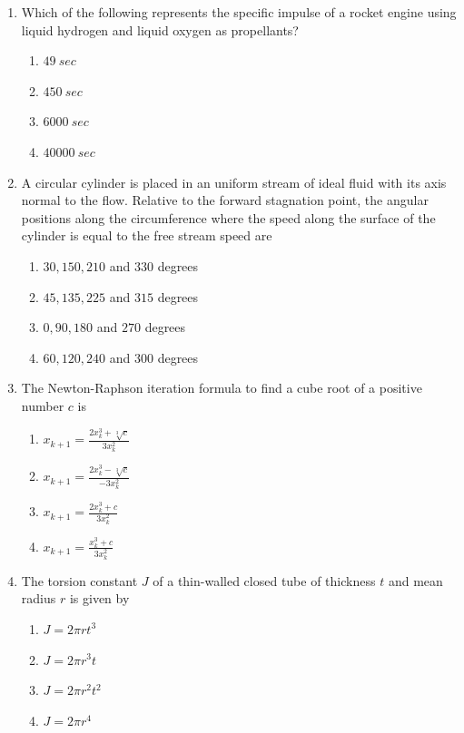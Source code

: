 \documentclass{article}
\begin{document}
\begin{enumerate}
    \item Which of the following represents the specific impulse of a rocket engine using liquid hydrogen and liquid oxygen as propellants?
    \begin{multicols}{4}
    \begin{enumerate}
        \item $49\ sec$
        \item $450\ sec$
        \item $6000\ sec$
        \item $40000\ sec$
    \end{enumerate}
    \end{multicols}
    

    \item A circular cylinder is placed in an uniform stream of ideal fluid with its axis normal to the flow. Relative to the forward stagnation point, the angular positions along the circumference where the speed along the surface of the cylinder is equal to the free stream speed are
    \begin{enumerate}
        \item $30, 150, 210$ and $330$ degrees
        \item $45, 135, 225$ and $315$ degrees
        \item $0, 90, 180$ and $270$ degrees
        \item $60, 120, 240$ and $300$ degrees
    \end{enumerate}

    \item The Newton-Raphson iteration formula to find a cube root of a positive number $c$ is
    \begin{enumerate}
        \item $x_{k+1} = \frac{2 x_k^3 + \sqrt[3]{c}}{3 x_k^2}$
        \item $x_{k+1} = \frac{2 x_k^3 - \sqrt[3]{c}}{-3 x_k^2}$
        \item $x_{k+1} = \frac{2 x_k^3 + c}{3 x_k^2}$
        \item $x_{k+1} = \frac{x_k^3 + c}{3 x_k^2}$
    \end{enumerate}

    \item The torsion constant $J$ of a thin-walled closed tube of thickness $t$ and mean radius $r$ is given by
    \begin{multicols}{4}
    \begin{enumerate}
        \item $J = 2 \pi r t^3$
        \item $J = 2 \pi r^3 t$
        \item $J = 2 \pi r^2 t^2$
        \item $J = 2 \pi r^4$
    \end{enumerate}
    \end{multicols}
    


\end{enumerate}
\end{document}
